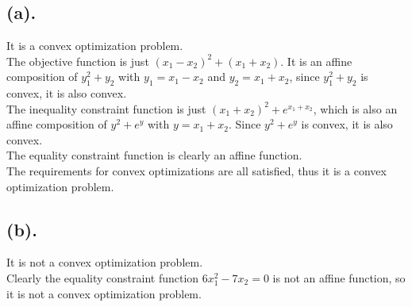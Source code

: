 \documentclass[12pt,letterpaper]{article}
\begin{document}
\section{}
\subsection*{(a).}
It is a convex optimization problem.\\
The objective function is just $(x_1-x_2)^2+(x_1+x_2)$. It is an affine composition of $y_1^2+y_2$ with $y_1=x_1-x_2$ and $y_2=x_1+x_2$, since $y_1^2+y_2$ is convex, it is also convex.\\
The inequality constraint function is just $(x_1+x_2)^2+e^{x_1+x_2}$, which is also an affine composition of $y^2+e^y$ with $y=x_1+x_2$. Since $y^2+e^y$ is convex, it is also convex.\\
The equality constraint function is clearly an affine function.\\
The requirements for convex optimizations are all satisfied, thus it is a convex optimization problem.

\subsection*{(b).}
It is not a convex optimization problem.\\
Clearly the equality constraint function $6x_1^2-7x_2=0$ is not an affine function, so it is not a convex optimization problem.
\end{document}
